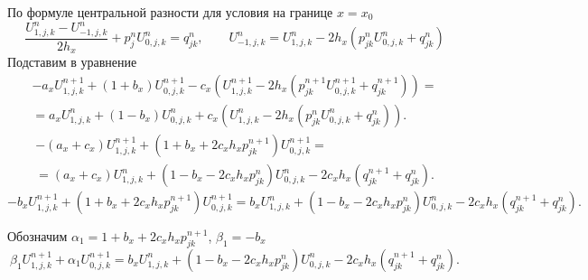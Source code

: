 \documentclass[a4paper,12pt]{article}
\begin{document}
По формуле центральной разности для условия на границе $x = x_0$
\begin{equation*}
  \frac{U^{n}_{1,j,k} -  U^{n}_{-1,j,k}}{2 h_x} + p_j^n U^n_{0,j,k}  = q_{jk}^{n}, \qquad
  U^{n}_{-1,j,k}  = U^{n}_{1,j,k} - 2 h_x \left( p_{jk}^n U^n_{0,j,k} + q_{jk}^{n} \right)
\end{equation*}
Подставим в уравнение
\begin{multline*}
  - a_x U^{n+1}_{1,j,k} + \left( 1 + b_x  \right) U^{n+1}_{0,j,k} - c_x \left( U^{n+1}_{1,j,k} - 2 h_x (p^{n+1}_{jk} U^{n+1}_{0,j,k} + q_{jk}^{n+1}) \right) = \\
  = a_x U^{n}_{1,j,k} + \left(1 - b_x \right) U^{n}_{0,j,k} + c_x \left(  U^{n}_{1,j,k} - 2 h_x (p^n_{jk} U^{n}_{0,j,k} + q_{jk}^{n}) \right).
\end{multline*}
\begin{multline*}
  - (a_x + c_x) U^{n+1}_{1,j,k} + \left( 1 + b_x + 2 c_x h_x p^{n+1}_{jk} \right) U^{n+1}_{0,j,k} = \\
  = (a_x + c_x) U^{n}_{1,j,k} + \left(1 - b_x - 2 c_x h_x p^{n}_{jk} \right) U^{n}_{0,j,k} - 2 c_x h_x (q_{jk}^{n+1} + q_{jk}^{n}).
\end{multline*}
\begin{equation}
  - b_x U^{n+1}_{1,j,k} + \left( 1 + b_x  + 2 c_x h_x p^{n+1}_{jk} \right) U^{n+1}_{0,j,k} =
  b_x U^{n}_{1,j,k} + \left(1 - b_x - 2 c_x h_x p^{n}_{jk} \right) U^{n}_{0,j,k} - 2 c_x h_x (q_{jk}^{n+1} + q_{jk}^{n}).
\end{equation}

Обозначим $\alpha_1 = 1 + b_x  + 2 c_x h_x p^{n+1}_{jk} $, $ \beta_1 = - b_x$
\begin{equation}
  \label{eq:3d-bc3-x0}
  \beta_1 U^{n+1}_{1,j,k} + \alpha_1 U^{n+1}_{0,j,k} =
  b_x U^{n}_{1,j,k} + \left(1 - b_x - 2 c_x h_x p^{n}_{jk} \right) U^{n}_{0,j,k} - 2 c_x h_x (q_{jk}^{n+1} + q_{jk}^{n}).
\end{equation}
\end{document}
